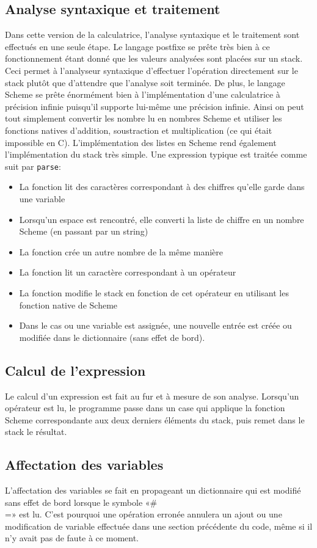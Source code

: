 \documentclass[11pt]{article}
\begin{document}
\subsection{Analyse syntaxique et traitement}
Dans cette version de la calculatrice, l'analyse syntaxique et le traitement sont effectués en une seule étape. Le langage postfixe se prête très bien à ce fonctionnement étant donné que les valeurs analysées sont placées sur un stack. Ceci permet à l'analyseur syntaxique d'effectuer l'opération directement sur le stack plutôt que d'attendre que l'analyse soit terminée. De plus, le langage Scheme se prête énormément bien à l'implémentation d'une calculatrice à précision infinie puisqu'il supporte lui-même une précision infinie. Ainsi on peut tout simplement convertir les nombre lu en nombres Scheme et utiliser les fonctions natives d'addition, soustraction et multiplication (ce qui était impossible en C). L'implémentation des listes en Scheme rend également l'implémentation du stack très simple. Une expression typique est traitée comme suit par \texttt{parse}:
\begin{itemize}
\item La fonction lit des caractères correspondant à des chiffres qu'elle garde dans une variable
\item Lorsqu'un espace est rencontré, elle converti la liste de chiffre en un nombre Scheme (en passant par un string)
\item La fonction crée un autre nombre de la même manière
\item La fonction lit un caractère correspondant à un opérateur
\item La fonction modifie le stack en fonction de cet opérateur en utilisant les fonction native de Scheme
\item Dans le cas ou une variable est assignée, une nouvelle entrée est créée ou modifiée dans le dictionnaire (sans effet de bord).
\end{itemize}

\subsection{Calcul de l'expression}
Le calcul d'un expression est fait au fur et à mesure de son analyse. Lorsqu'un opérateur est lu, le programme passe dans un case qui applique la fonction Scheme correspondante aux deux derniers éléments du stack, puis remet dans le stack le résultat.

\subsection{Affectation des variables}
L'affectation des variables se fait en propageant un dictionnaire qui est modifié sans effet de bord lorsque le symbole «\#\\=» est lu. C'est pourquoi une opération erronée annulera un ajout ou une modification de variable effectuée dans une section précédente du code, même si il n'y avait pas de faute à ce moment.
\end{document}
